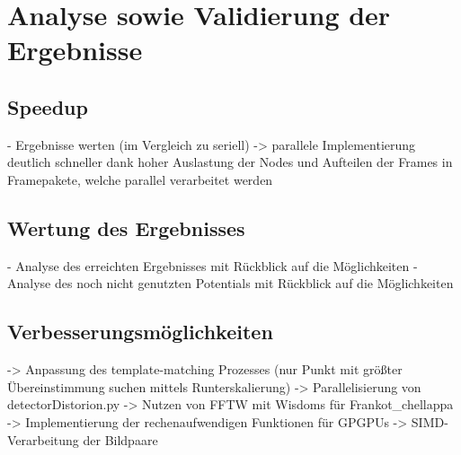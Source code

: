 \chapter{Analyse sowie Validierung der Ergebnisse}

\section{Speedup}

\begin{correctmore}
	- Ergebnisse werten (im Vergleich zu seriell)
	-> parallele Implementierung deutlich schneller dank hoher Auslastung der Nodes und Aufteilen der Frames in Framepakete, welche parallel verarbeitet werden
\end{correctmore}
\section{Wertung des Ergebnisses}

\begin{correctmore}
	- Analyse des erreichten Ergebnisses mit Rückblick auf die Möglichkeiten
	- Analyse des noch nicht genutzten Potentials mit Rückblick auf die Möglichkeiten
\end{correctmore}

\section{Verbesserungsmöglichkeiten}

\begin{correctmore}
	-> Anpassung des template-matching Prozesses (nur Punkt mit größter Übereinstimmung suchen mittels Runterskalierung)
	-> Parallelisierung von detectorDistorion.py
	-> Nutzen von FFTW mit Wisdoms für Frankot\_chellappa
	-> Implementierung der rechenaufwendigen Funktionen für GPGPUs
	-> SIMD-Verarbeitung der Bildpaare
\end{correctmore}